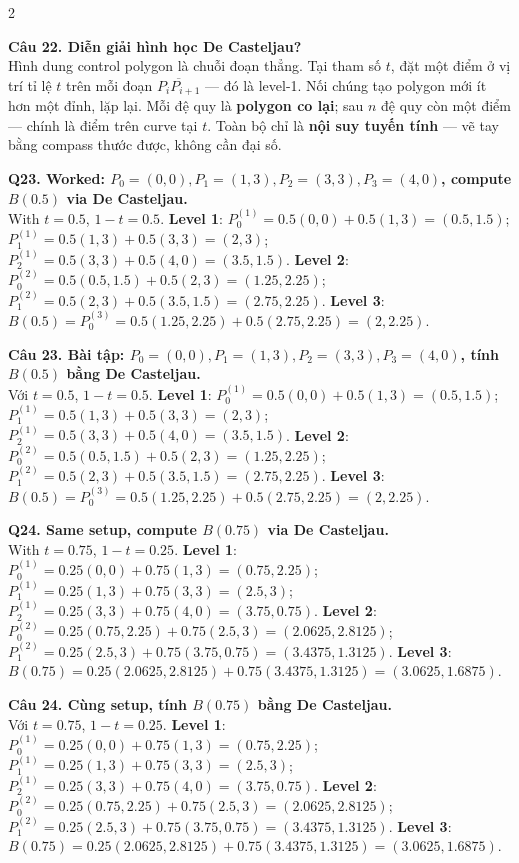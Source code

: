 \begin{paracol}{2}
\switchcolumn

\textbf{Câu 22. Diễn giải hình học De Casteljau?}\\
Hình dung control polygon là chuỗi đoạn thẳng. Tại tham số $t$, đặt một điểm ở vị trí tỉ lệ $t$ trên mỗi đoạn $\overline{P_iP_{i+1}}$ — đó là level-1. Nối chúng tạo polygon mới ít hơn một đỉnh, lặp lại. Mỗi đệ quy là \textbf{polygon co lại}; sau $n$ đệ quy còn một điểm — chính là điểm trên curve tại $t$. Toàn bộ chỉ là \textbf{nội suy tuyến tính} — vẽ tay bằng compass thước được, không cần đại số.

\switchcolumn*

\textbf{Q23. Worked: $P_0=(0,0), P_1=(1,3), P_2=(3,3), P_3=(4,0)$, compute $B(0.5)$ via De Casteljau.}\\
With $t=0.5$, $1-t=0.5$.
\textbf{Level 1}:\;
$P_0^{(1)}=0.5(0,0)+0.5(1,3)=(0.5, 1.5)$;\;
$P_1^{(1)}=0.5(1,3)+0.5(3,3)=(2, 3)$;\;
$P_2^{(1)}=0.5(3,3)+0.5(4,0)=(3.5, 1.5)$.
\textbf{Level 2}:\;
$P_0^{(2)}=0.5(0.5,1.5)+0.5(2,3)=(1.25, 2.25)$;\;
$P_1^{(2)}=0.5(2,3)+0.5(3.5,1.5)=(2.75, 2.25)$.
\textbf{Level 3}:\;
$B(0.5)=P_0^{(3)}=0.5(1.25,2.25)+0.5(2.75,2.25)=(2, 2.25)$.

\switchcolumn

\textbf{Câu 23. Bài tập: $P_0=(0,0), P_1=(1,3), P_2=(3,3), P_3=(4,0)$, tính $B(0.5)$ bằng De Casteljau.}\\
Với $t=0.5$, $1-t=0.5$.
\textbf{Level 1}:\;
$P_0^{(1)}=0.5(0,0)+0.5(1,3)=(0.5, 1.5)$;\;
$P_1^{(1)}=0.5(1,3)+0.5(3,3)=(2, 3)$;\;
$P_2^{(1)}=0.5(3,3)+0.5(4,0)=(3.5, 1.5)$.
\textbf{Level 2}:\;
$P_0^{(2)}=0.5(0.5,1.5)+0.5(2,3)=(1.25, 2.25)$;\;
$P_1^{(2)}=0.5(2,3)+0.5(3.5,1.5)=(2.75, 2.25)$.
\textbf{Level 3}:\;
$B(0.5)=P_0^{(3)}=0.5(1.25,2.25)+0.5(2.75,2.25)=(2, 2.25)$.

\switchcolumn*

\textbf{Q24. Same setup, compute $B(0.75)$ via De Casteljau.}\\
With $t=0.75$, $1-t=0.25$.
\textbf{Level 1}:\;
$P_0^{(1)}=0.25(0,0)+0.75(1,3)=(0.75, 2.25)$;\;
$P_1^{(1)}=0.25(1,3)+0.75(3,3)=(2.5, 3)$;\;
$P_2^{(1)}=0.25(3,3)+0.75(4,0)=(3.75, 0.75)$.
\textbf{Level 2}:\;
$P_0^{(2)}=0.25(0.75,2.25)+0.75(2.5,3)=(2.0625, 2.8125)$;\;
$P_1^{(2)}=0.25(2.5,3)+0.75(3.75,0.75)=(3.4375, 1.3125)$.
\textbf{Level 3}:\;
$B(0.75)=0.25(2.0625,2.8125)+0.75(3.4375,1.3125)=(3.0625, 1.6875)$.

\switchcolumn

\textbf{Câu 24. Cùng setup, tính $B(0.75)$ bằng De Casteljau.}\\
Với $t=0.75$, $1-t=0.25$.
\textbf{Level 1}:\;
$P_0^{(1)}=0.25(0,0)+0.75(1,3)=(0.75, 2.25)$;\;
$P_1^{(1)}=0.25(1,3)+0.75(3,3)=(2.5, 3)$;\;
$P_2^{(1)}=0.25(3,3)+0.75(4,0)=(3.75, 0.75)$.
\textbf{Level 2}:\;
$P_0^{(2)}=0.25(0.75,2.25)+0.75(2.5,3)=(2.0625, 2.8125)$;\;
$P_1^{(2)}=0.25(2.5,3)+0.75(3.75,0.75)=(3.4375, 1.3125)$.
\textbf{Level 3}:\;
$B(0.75)=0.25(2.0625,2.8125)+0.75(3.4375,1.3125)=(3.0625, 1.6875)$.


\end{paracol}
